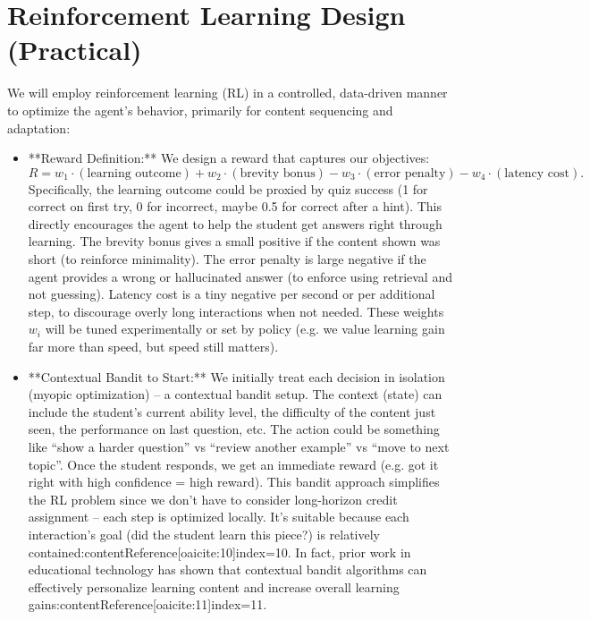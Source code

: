 \documentclass[11pt]{article}
\begin{document}
\section{Reinforcement Learning Design (Practical)}
We will employ reinforcement learning (RL) in a controlled, data-driven manner to optimize the agent’s behavior, primarily for content sequencing and adaptation:
\begin{itemize}
  \item **Reward Definition:** We design a reward that captures our objectives: 
    $$R = w_1 \cdot (\text{learning outcome}) + w_2 \cdot (\text{brevity bonus}) - w_3 \cdot (\text{error penalty}) - w_4 \cdot (\text{latency cost}).$$ 
    Specifically, the learning outcome could be proxied by quiz success (1 for correct on first try, 0 for incorrect, maybe 0.5 for correct after a hint). This directly encourages the agent to help the student get answers right through learning. The brevity bonus gives a small positive if the content shown was short (to reinforce minimality). The error penalty is large negative if the agent provides a wrong or hallucinated answer (to enforce using retrieval and not guessing). Latency cost is a tiny negative per second or per additional step, to discourage overly long interactions when not needed. These weights $w_i$ will be tuned experimentally or set by policy (e.g. we value learning gain far more than speed, but speed still matters).
  \item **Contextual Bandit to Start:** We initially treat each decision in isolation (myopic optimization) – a contextual bandit setup. The context (state) can include the student’s current ability level, the difficulty of the content just seen, the performance on last question, etc. The action could be something like “show a harder question” vs “review another example” vs “move to next topic”. Once the student responds, we get an immediate reward (e.g. got it right with high confidence = high reward). This bandit approach simplifies the RL problem since we don’t have to consider long-horizon credit assignment – each step is optimized locally. It’s suitable because each interaction’s goal (did the student learn this piece?) is relatively contained:contentReference[oaicite:10]{index=10}. In fact, prior work in educational technology has shown that contextual bandit algorithms can effectively personalize learning content and increase overall learning gains:contentReference[oaicite:11]{index=11}.

\end{itemize}
\end{document}
